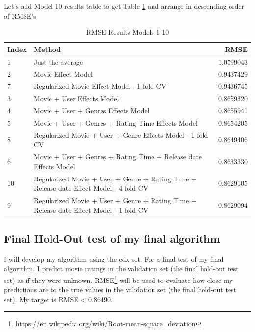 \documentclass[
]{article}
\DeclareRobustCommand{\href}[2]{#2\footnote{\url{#1}}}
\begin{document}
Let's add Model 10 results table to get Table
\ref{tbl:rmse_results_model_1-10} and arrange in descending order of
RMSE's

\begin{table}[H]

\caption{\label{tab:m10_4}RMSE Results Models 1-10\label{tbl:rmse_results_model_1-10}}
\centering
\fontsize{7}{9}\selectfont
\begin{tabular}[t]{llr}
\toprule
Index & Method & RMSE\\
\midrule
1 & Just the average & 1.0599043\\
2 & Movie Effect Model & 0.9437429\\
7 & Regularized Movie Effect Model - 1 fold CV & 0.9436745\\
3 & Movie + User Effects Model & 0.8659320\\
4 & Movie + User + Genres Effects Model & 0.8655941\\
5 & Movie + User + Genres + Rating Time Effects Model & 0.8654205\\
8 & Regularized Movie + User + Genre Effects Model - 1 fold CV & 0.8649406\\
6 & Movie + User + Genres + Rating Time + Release date Effects Model & 0.8633330\\
10 & Regularized Movie + User + Genre + Rating Time + Release date Effect Model - 4 fold CV & 0.8629105\\
9 & Regularized Movie + User + Genre + Rating Time + Release date Effect Model - 1 fold CV & 0.8629094\\
\bottomrule
\end{tabular}
\end{table}

\newpage

\hypertarget{final-hold-out-test-of-my-final-algorithm}{%
\subsection{Final Hold-Out test of my final
algorithm}\label{final-hold-out-test-of-my-final-algorithm}}

I will develop my algorithm using the edx set. For a final test of my
final algorithm, I predict movie ratings in the validation set (the
final hold-out test set) as if they were unknown.
\href{https://en.wikipedia.org/wiki/Root-mean-square_deviation}{RMSE}
will be used to evaluate how close my predictions are to the true values
in the validation set (the final hold-out test set). My target is RMSE
\textless{} 0.86490.
\end{document}
